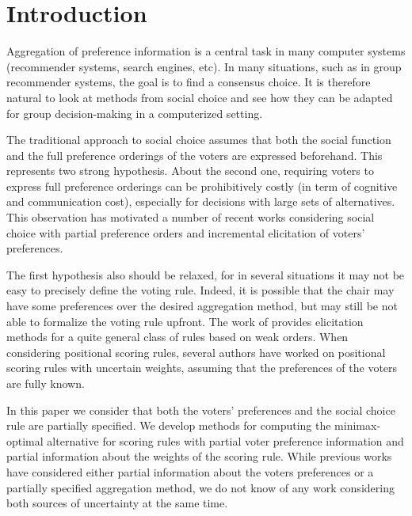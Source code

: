 \section{Introduction}
Aggregation of preference information is a central task in many computer systems (recommender systems, search engines, etc).
In many situations, such as in group recommender systems, the goal is to find a consensus choice.
It is therefore natural to look at methods from social choice and see how they can be adapted for group decision-making in a computerized setting.

The traditional approach to social choice assumes that both the social function and the full preference orderings of the voters are expressed beforehand. This represents two strong hypothesis.
About the second one, requiring voters to express full preference orderings can be prohibitively costly (in term of cognitive and communication cost), especially for decisions with large sets of alternatives.
This observation has motivated a number of recent works considering social choice with partial preference orders  \citep{Xia2008,Pini2009,Konczak05} and incremental elicitation \citep{Kalech2011, Lu2011, Naamani-Dery2015} of voters’ preferences. 

The first hypothesis also should be relaxed, for in several situations it may not be easy to precisely define the voting rule.
Indeed, it is possible that the chair may have some preferences over the desired aggregation method, but may still be not able to formalize the voting rule upfront.
The work of \citet{Cailloux2014} provides elicitation methods for a quite general class of rules based on weak orders.
When considering positional scoring rules, several authors \citep{Stein1994, Llamazares2013, Viappiani2018} have worked on positional scoring rules with uncertain weights, assuming that the preferences of the voters are fully known.

In this paper we consider that both the voters’ preferences and the social choice rule are partially specified.
We develop methods for computing the minimax-optimal alternative for scoring rules with partial voter preference information and partial information about the weights of the scoring rule.
While previous works have considered either partial information about the voters preferences or a partially specified aggregation method, we do not know of any work considering both sources of uncertainty at the same time.

